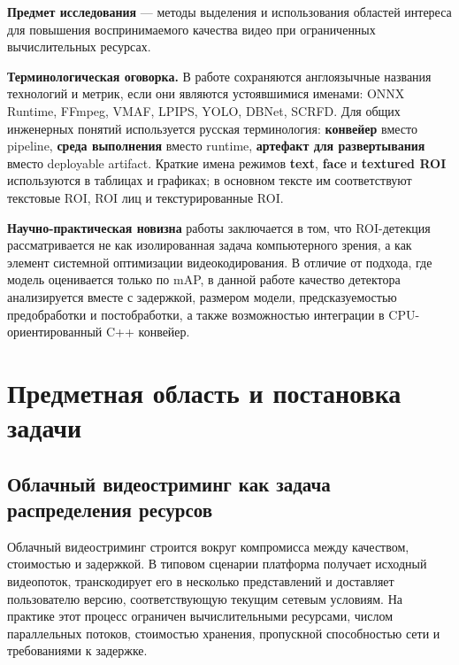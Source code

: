 \documentclass[12pt,a4paper,oneside,openany]{report}
\newcommand{\important}[1]{\textbf{#1}}
\begin{document}
\important{Предмет исследования} --- методы выделения и использования областей интереса для повышения воспринимаемого качества видео при ограниченных вычислительных ресурсах.

\important{Терминологическая оговорка.} В работе сохраняются англоязычные названия технологий и метрик, если они являются устоявшимися именами: ONNX Runtime, FFmpeg, VMAF, LPIPS, YOLO, DBNet, SCRFD. Для общих инженерных понятий используется русская терминология: \important{конвейер} вместо pipeline, \important{среда выполнения} вместо runtime, \important{артефакт для развертывания} вместо deployable artifact. Краткие имена режимов \important{text}, \important{face} и \important{textured ROI} используются в таблицах и графиках; в основном тексте им соответствуют текстовые ROI, ROI лиц и текстурированные ROI.

\important{Научно-практическая новизна} работы заключается в том, что ROI-детекция рассматривается не как изолированная задача компьютерного зрения, а как элемент системной оптимизации видеокодирования. В отличие от подхода, где модель оценивается только по mAP, в данной работе качество детектора анализируется вместе с задержкой, размером модели, предсказуемостью предобработки и постобработки, а также возможностью интеграции в CPU-ориентированный C++ конвейер.


\chapter{Предметная область и постановка задачи}

\section{Облачный видеостриминг как задача распределения ресурсов}

Облачный видеостриминг строится вокруг компромисса между качеством, стоимостью и задержкой. В типовом сценарии платформа получает исходный видеопоток, транскодирует его в несколько представлений и доставляет пользователю версию, соответствующую текущим сетевым условиям. На практике этот процесс ограничен вычислительными ресурсами, числом параллельных потоков, стоимостью хранения, пропускной способностью сети и требованиями к задержке.
\end{document}
